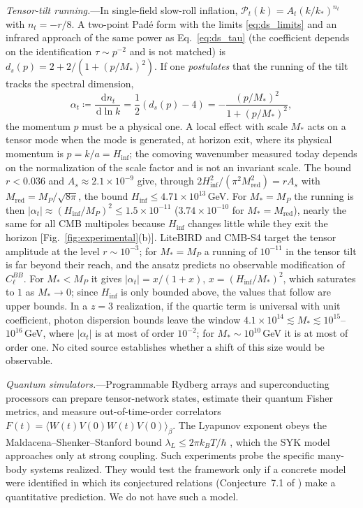 \documentclass[aps,prl,reprint,twocolumn,superscriptaddress,nofootinbib,floatfix]{revtex4-2}
\newcommand{\dif}{\,\mathrm{d}}
\begin{document}
\emph{Tensor-tilt running.}---In single-field slow-roll inflation, $\mathcal{P}_t(k) = A_t (k/k_*)^{n_t}$ with $n_t = -r/8$. A two-point Pad\'e form with the limits \eqref{eq:ds_limits} and an infrared approach of the same power as Eq.~\eqref{eq:ds_tau} (the coefficient depends on the identification $\tau \sim p^{-2}$ and is not matched) is $d_s(p) = 2 + 2/(1 + (p/M_\ast)^2)$. If one \emph{postulates} that the running of the tilt tracks the spectral dimension,
\begin{equation}
    \label{eq:tensor_running}
    \alpha_t \coloneqq \frac{\dif n_t}{\dif \ln k} = \frac{1}{2} \left( d_s(p) - 4 \right) = -\frac{(p/M_\ast)^2}{1 + (p/M_\ast)^2},
\end{equation}
the momentum $p$ must be a physical one. A local effect with scale $M_\ast$ acts on a tensor mode when the mode is generated, at horizon exit, where its physical momentum is $p = k/a = H_{\mathrm{inf}}$; the comoving wavenumber measured today depends on the normalization of the scale factor and is not an invariant scale. The bound $r < 0.036$ \cite{bicepkeck2021constraints} and $A_s \approx 2.1 \times 10^{-9}$ \cite{planck2018parameters} give, through $2H_{\mathrm{inf}}^2/(\pi^2 M_{\mathrm{red}}^2) = rA_s$ with $M_{\mathrm{red}} = M_P/\sqrt{8\pi}$, the bound $H_{\mathrm{inf}} \le 4.71 \times 10^{13}$\,GeV. For $M_\ast = M_P$ the running is then $|\alpha_t| \approx (H_{\mathrm{inf}}/M_P)^2 \le 1.5 \times 10^{-11}$ ($3.74 \times 10^{-10}$ for $M_\ast = M_{\mathrm{red}}$), nearly the same for all CMB multipoles because $H_{\mathrm{inf}}$ changes little while they exit the horizon [Fig.~\ref{fig:experimental}(b)]. LiteBIRD \cite{hazumi2019litebird} and CMB-S4 \cite{abazajian2016cmb} target the tensor amplitude at the level $r \sim 10^{-3}$; for $M_\ast = M_P$ a running of $10^{-11}$ in the tensor tilt is far beyond their reach, and the ansatz predicts no observable modification of $C_\ell^{BB}$. For $M_\ast < M_P$ it gives $|\alpha_t| = x/(1+x)$, $x = (H_{\mathrm{inf}}/M_\ast)^2$, which saturates to $1$ as $M_\ast \to 0$; since $H_{\mathrm{inf}}$ is only bounded above, the values that follow are upper bounds. In a $z = 3$ realization, if the quartic term is universal with unit coefficient, photon dispersion bounds leave the window $4.1\times10^{14} \lesssim M_\ast \lesssim 10^{15}$--$10^{16}$\,GeV, where $|\alpha_t|$ is at most of order $10^{-2}$; for $M_\ast \sim 10^{10}$\,GeV it is at most of order one. No cited source establishes whether a shift of this size would be observable.

\emph{Quantum simulators.}---Programmable Rydberg arrays \cite{ebadi2021quantum} and superconducting processors can prepare tensor-network states, estimate their quantum Fisher metrics, and measure out-of-time-order correlators $F(t) = \langle W(t) V(0) W(t) V(0) \rangle_\beta$. The Lyapunov exponent obeys the Maldacena--Shenker--Stanford bound $\lambda_L \le 2\pi k_B T/\hbar$ \cite{maldacena2016bound}, which the SYK model approaches only at strong coupling. Such experiments probe the specific many-body systems realized. They would test the framework only if a concrete model were identified in which its conjectured relations (Conjecture~7.1 of \cite{silvafilho2026grand}) make a quantitative prediction. We do not have such a model.
\end{document}
